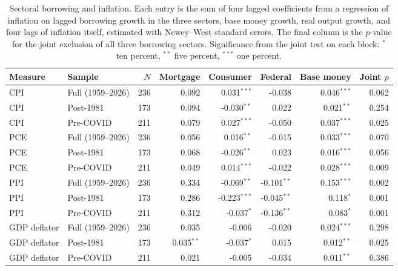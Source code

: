 \begin{table}[htbp]
\centering
\setlength{\belowcaptionskip}{8pt}
\footnotesize
\setlength{\tabcolsep}{4pt}
\caption{Sectoral borrowing and inflation. Each entry is the sum of four lagged coefficients from a regression of inflation on lagged borrowing growth in the three sectors, base money growth, real output growth, and four lags of inflation itself, estimated with Newey--West standard errors. The final column is the $p$-value for the joint exclusion of all three borrowing sectors. Significance from the joint test on each block: $^{*}$ ten percent, $^{**}$ five percent, $^{***}$ one percent.}
\label{tab:creditinfl}
\begin{tabular}{llrrrrrr}
\toprule
Measure & Sample & $N$ & Mortgage & Consumer & Federal & Base money & Joint $p$ \\
\midrule
CPI & Full (1959--2026) & 236 & 0.092 & 0.031$^{***}$ & -0.038 & 0.046$^{***}$ & 0.062 \\
CPI & Post-1981 & 173 & 0.094 & -0.030$^{**}$ & 0.022 & 0.021$^{**}$ & 0.254 \\
CPI & Pre-COVID & 211 & 0.079 & 0.027$^{***}$ & -0.050 & 0.037$^{***}$ & 0.025 \\
PCE & Full (1959--2026) & 236 & 0.056 & 0.016$^{**}$ & -0.015 & 0.033$^{***}$ & 0.070 \\
PCE & Post-1981 & 173 & 0.068 & -0.026$^{**}$ & 0.023 & 0.016$^{***}$ & 0.056 \\
PCE & Pre-COVID & 211 & 0.049 & 0.014$^{***}$ & -0.022 & 0.028$^{***}$ & 0.009 \\
PPI & Full (1959--2026) & 236 & 0.334 & -0.069$^{**}$ & -0.101$^{**}$ & 0.153$^{***}$ & 0.002 \\
PPI & Post-1981 & 173 & 0.286 & -0.223$^{***}$ & -0.045$^{**}$ & 0.118$^{*}$ & 0.001 \\
PPI & Pre-COVID & 211 & 0.312 & -0.037$^{*}$ & -0.136$^{**}$ & 0.083$^{*}$ & 0.001 \\
GDP deflator & Full (1959--2026) & 236 & 0.035 & -0.006 & -0.020 & 0.024$^{***}$ & 0.298 \\
GDP deflator & Post-1981 & 173 & 0.035$^{**}$ & -0.037$^{*}$ & 0.015 & 0.012$^{**}$ & 0.025 \\
GDP deflator & Pre-COVID & 211 & 0.021 & -0.005 & -0.034 & 0.011$^{**}$ & 0.386 \\
\bottomrule
\end{tabular}
\end{table}



